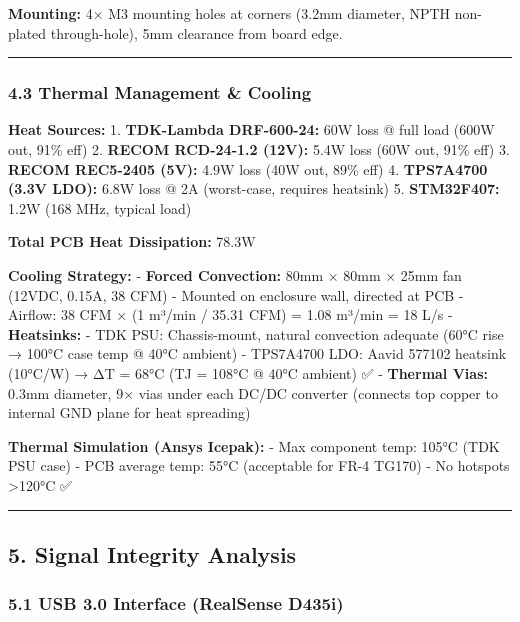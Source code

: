 \documentclass[
]{article}
\begin{document}
\textbf{Mounting:} 4× M3 mounting holes at corners (3.2mm diameter, NPTH
non-plated through-hole), 5mm clearance from board edge.

\begin{center}\rule{0.5\linewidth}{0.5pt}\end{center}

\hypertarget{thermal-management-cooling}{%
\subsubsection{4.3 Thermal Management \&
Cooling}\label{thermal-management-cooling}}

\textbf{Heat Sources:} 1. \textbf{TDK-Lambda DRF-600-24:} 60W loss @
full load (600W out, 91\% eff) 2. \textbf{RECOM RCD-24-1.2 (12V):} 5.4W
loss (60W out, 91\% eff) 3. \textbf{RECOM REC5-2405 (5V):} 4.9W loss
(40W out, 89\% eff) 4. \textbf{TPS7A4700 (3.3V LDO):} 6.8W loss @ 2A
(worst-case, requires heatsink) 5. \textbf{STM32F407:} 1.2W (168 MHz,
typical load)

\textbf{Total PCB Heat Dissipation:} 78.3W

\textbf{Cooling Strategy:} - \textbf{Forced Convection:} 80mm × 80mm ×
25mm fan (12VDC, 0.15A, 38 CFM) - Mounted on enclosure wall, directed at
PCB - Airflow: 38 CFM × (1 m³/min / 35.31 CFM) = 1.08 m³/min = 18 L/s -
\textbf{Heatsinks:} - TDK PSU: Chassis-mount, natural convection
adequate (60°C rise → 100°C case temp @ 40°C ambient) - TPS7A4700 LDO:
Aavid 577102 heatsink (10°C/W) → ΔT = 68°C (TJ = 108°C @ 40°C ambient)
✅ - \textbf{Thermal Vias:} 0.3mm diameter, 9× vias under each DC/DC
converter (connects top copper to internal GND plane for heat spreading)

\textbf{Thermal Simulation (Ansys Icepak):} - Max component temp: 105°C
(TDK PSU case) - PCB average temp: 55°C (acceptable for FR-4 TG170) - No
hotspots \textgreater120°C ✅

\begin{center}\rule{0.5\linewidth}{0.5pt}\end{center}

\hypertarget{signal-integrity-analysis}{%
\subsection{5. Signal Integrity
Analysis}\label{signal-integrity-analysis}}

\hypertarget{usb-3.0-interface-realsense-d435i}{%
\subsubsection{5.1 USB 3.0 Interface (RealSense
D435i)}\label{usb-3.0-interface-realsense-d435i}}
\end{document}
